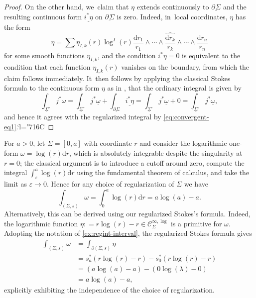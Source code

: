 \documentclass[10pt]{amsart}
\newcommand{\Changelback}{\mathcode`l="716C}
\theoremstyle{definition}
\theoremstyle{remark}
\newenvironment{example}
  {\pushQED{\qed}\renewcommand{\qedsymbol}{$\lozenge$}\examplex}
  {\popQED\endexamplex}
\newcommand{\defas}{\mathrel{\mathop:}=}
\let\epsilon\varepsilon
\newcommand{\Cinflog}[1]{\mathscr{C}^{\infty,\log}_{#1}}
\newcommand{\dd}{\mathrm{d}}
\newcommand{\dlog}[1]{\frac{\dd#1}{#1}}
\newcommand{\Sig}{\Sigma}
\newcommand{\uSigo}{\underline{\Sigma}^\circ}
\newcommand{\ubdSig}[1][]{\underline{\partial^{#1}\Sigma}}
\begin{document}
\begin{proof}
On the other hand, we~claim that $\eta$ extends continuously to $\ubdSig$ and the resulting continuous form $\underline{i^*\eta}$ on $\ubdSig$ is zero. Indeed, in~local coordinates, $\eta$ has the form\vspace*{-3pt}
\[
\eta = \sum \eta_{I,k}(r) \log^I(r) \dlog{r_1}\wedge \cdots \wedge \widehat{\dlog{r_k}} \wedge \cdots \wedge \dlog{r_n}
\]
for some smooth functions $\eta_{I,k}$, and the condition $i^*\eta=0$ is equivalent to the condition that each function $\eta_{I,k}(r)$ vanishes on the boundary, from which the claim follows immediately. It~then follows by applying the classical Stokes formula to the continuous form $\eta$ as in \cite[Th.\,4.11]{Brown2009}, that the ordinary integral is given by\vspace*{-3pt}
\[
\int_{\uSigo}j^*\omega = \int_{\uSigo}j^*{\underline{\omega}} + \int_{\ubdSig} \underline{i^*\eta} = \int_{\uSigo}j^*{\underline{\omega}} + 0 = \int_{\uSigo}j^*{\underline{\omega}},
\]
and hence it agrees with the regularized integral by \eqref{eq:convergent-eq1}.\Changelback
\end{proof}

\begin{example}
For $a > 0$, let $\Sig = [0,a]$ with coordinate $r$ and consider the logarithmic one-form $\omega = \log(r)\dd r$, which is absolutely integrable despite the singularity at $r=0$; the classical argument is to introduce a cutoff around zero, compute the integral $\int_{\epsilon}^a \log(r)\dd r$ using the fundamental theorem of calculus, and take the limit as $\epsilon \to 0$.
Hence for any choice of regularization of $\Sig$ we have\vspace*{-3pt}
\[
\int_{(\Sig,s)} \omega = \int_0^a \log(r) \dd r = a \log(a) - a.
\]
Alternatively, this can be derived using our regularized Stokes's formula. Indeed, the logarithmic function $\eta \defas r \log(r) - r \in \Cinflog{\Sig}$ is a primitive for $\omega$. Adopting the notation of \autoref{ex:regint-interval}, the regularized Stokes formula gives\vspace*{-3pt}
\begin{align*}
\int_{(\Sig,s)} \omega &= \int_{\partial(\Sig,s)}\eta\\
&= s_a^* (r\log(r) -r ) - s_0^*(r\log(r) - r) \\
&= (a\log(a) -a ) - (0\log(\lambda) - 0) \\
&= a\log(a) - a,
\end{align*}
explicitly exhibiting the independence of the choice of regularization.
\end{example}
\end{document}
